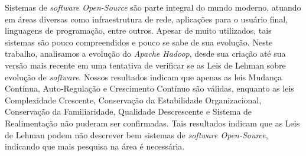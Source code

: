 Sistemas de \textit{software Open-Source} são parte integral do mundo moderno, atuando em áreas diversas como infraestrutura de rede, aplicações para o usuário final, linguagens de programação, entre outros. Apesar de muito utilizados, tais sistemas são pouco compreendidos e pouco se sabe de sua evolução. Neste trabalho, analisamos a evolução do \textit{Apache Hadoop}, desde sua criação até sua versão mais recente em uma tentativa de verificar se as Leis de Lehman sobre evolução de \textit{software}. Nossos resultados indicam que apenas as leis Mudança Contínua, Auto-Regulação e Crescimento Contínuo são válidas, enquanto as leis Complexidade Crescente, Conservação da Estabilidade Organizacional, Conservação da Familiaridade, Qualidade Descrescente e Sistema de Realimentação não puderam ser confirmadas. Tais resultados indicam que as Leis de Lehman podem não descrever bem sistemas de \textit{software Open-Source}, indicando que mais pesquisa na área é necessária.